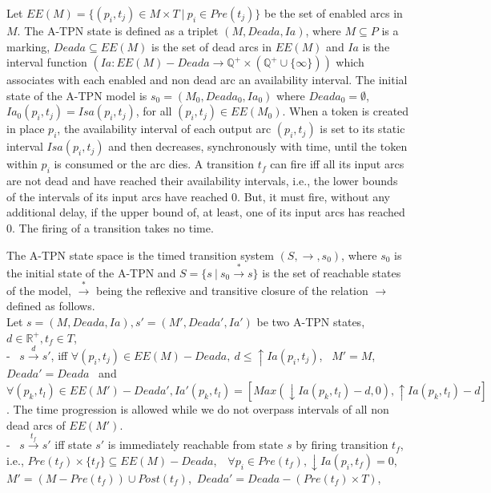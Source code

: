 \documentclass[submission,copyright,creativecommons]{eptcs}
\numberwithin{equation}{section}
\begin{document}
\par Let $EE(M)=\{(p_i,t_j) \in M \times T \ | \ p_i \in Pre(t_j) \}$ be the set of enabled arcs in $M$. The A-TPN state is defined as a triplet \((M,Deada, Ia)\), where \(M \subseteq P\) is a
marking, $Deada \subseteq EE(M)$ is the set of dead arcs in $EE(M)$ and \(Ia\) is the interval function \((Ia: EE(M) - Deada \rightarrow \mathbb{Q}^{+}\times(\mathbb{Q}^{+}\cup \{\infty\}))\) which associates with each enabled and non dead arc an availability interval. The initial state of the A-TPN model is \(s_{0}=(M_{0},Deada_0, Ia_{0})\) where $Deada_0=\emptyset$, \(Ia_{0}(p_i,t_j) = Isa(p_i,t_j)\), for all \((p_i,t_j) \in EE(M_0)\). When a token is created in place \(p_i\), the availability interval of each output arc $(p_i,t_j)$ is set to its static interval \(Isa(p_i,t_j)\) and then decreases,  synchronously with time, until the token within $p_i$ is consumed or the arc dies. A transition \(t_f\) can fire iff all its input arcs are not dead and have reached their availability intervals, i.e., the lower bounds of the intervals of its input arcs have reached $0$. But, it must fire, without any additional delay, if the upper bound of, at least, one of its input arcs has reached $0$. The firing of a transition takes no time.
\par The A-TPN state space is the timed transition system \((S, \rightarrow,
s_{0})\), where \(s_{0}\) is the initial state of
the A-TPN and \(S = \{s \ | \ s_{0}\overset{*}\rightarrow s \}\)
 is the set of reachable states of the model, \(\overset{*}\rightarrow\) being the reflexive and transitive closure  of the relation \(\rightarrow\) defined as follows.\\
Let \(s=(M,Deada,Ia), s'=(M',Deada', Ia')\) be two A-TPN states, \(d \in \mathbb{R^+}, t_f \in T\),\\ - \ \(s
\overset{d}\rightarrow s'\), iff \(\forall (p_i,t_j) \in EE(M)-Deada, \
d  \leq  {\uparrow Ia(p_i,t_j)}\), \ \(M'= M\), $Deada'=Deada$ \ and \
\(\forall (p_k,t_l) \in EE(M')-Deada', Ia'(p_k,t_l) =  [Max(\downarrow Ia(p_k,t_l)- d,0), {\uparrow Ia(p_k,t_l)}-d]\). The time progression is allowed while we do not overpass intervals of all non dead arcs of $EE(M')$.\\ - \ \(s \overset{t_f}\rightarrow s'\) iff  state \(s'\) is immediately reachable from state \(s\) by firing transition \(t_f\), i.e.,
\(Pre(t_f)\times \{t_f\} \subseteq EE(M)-Deada\),\ \ \( \forall p_i \in Pre(t_f),  {\downarrow Ia(p_i,t_f)} = 0\),
 \(M' = (M - Pre(t_f)) \cup Post(t_f)\),\ $Deada'=Deada - (Pre(t_f) \times T)$,
\end{document}
